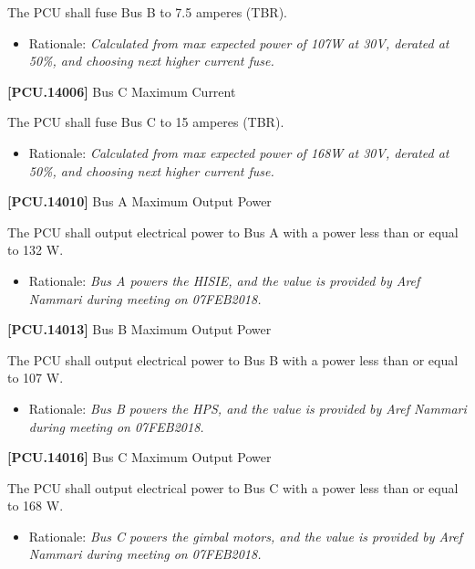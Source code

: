 The \gls{PCU} shall fuse Bus B to 7.5 amperes (TBR\label{tbx_8}).

\begin{itemize}
\item{} Rationale: \emph{Calculated from max expected power of 107W at 30V, derated at 50\%, and choosing next higher current fuse.}

\end{itemize}

\textbf{[PCU.14006]} Bus C Maximum Current

The \gls{PCU} shall fuse Bus C to 15 amperes (TBR\label{tbx_9}).

\begin{itemize}
\item{} Rationale: \emph{Calculated from max expected power of 168W at 30V, derated at 50\%, and choosing next higher current fuse.}

\end{itemize}

\textbf{[PCU.14010]} Bus A Maximum Output Power

The \gls{PCU} shall output electrical power to Bus A with a power less than or equal to 132 W.

\begin{itemize}
\item{} Rationale: \emph{Bus A powers the HISIE, and the value is provided by Aref Nammari during meeting on 07FEB2018.}

\end{itemize}

\textbf{[PCU.14013]} Bus B Maximum Output Power

The \gls{PCU} shall output electrical power to Bus B with a power less than or equal to 107 W.

\begin{itemize}
\item{} Rationale: \emph{Bus B powers the HPS, and the value is provided by Aref Nammari during meeting on 07FEB2018.}

\end{itemize}

\textbf{[PCU.14016]} Bus C Maximum Output Power

The \gls{PCU} shall output electrical power to Bus C with a power less than or equal to 168 W.

\begin{itemize}
\item{} Rationale: \emph{Bus C powers the gimbal motors, and the value is provided by Aref Nammari during meeting on 07FEB2018.}

\end{itemize}


